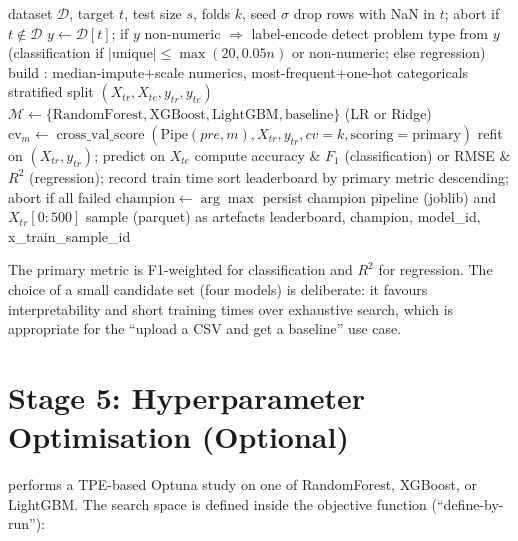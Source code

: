 \begin{algorithm}[H]
\caption{Parallel bake-off ().}
\label{alg:bakeoff}
\begin{algorithmic}[1]
\Require dataset $\mathcal{D}$, target $t$, test size $s$, folds $k$, seed $\sigma$
\State drop rows with NaN in $t$; abort if $t \notin \mathcal{D}$
\State $y \gets \mathcal{D}[t]$; if $y$ non-numeric $\Rightarrow$ label-encode
\State detect problem type from $y$ (classification if $|\text{unique}| \le \max(20, 0.05n)$ or non-numeric; else regression)
\State build : median-impute+scale numerics, most-frequent+one-hot categoricals
\State stratified split $(X_{tr}, X_{te}, y_{tr}, y_{te})$
\State $\mathcal{M} \gets \{\text{RandomForest}, \text{XGBoost}, \text{LightGBM}, \text{baseline}\}$ (LR or Ridge)
  \State $\text{cv}_m \gets \operatorname{cross\_val\_score}(\text{Pipe}(pre, m), X_{tr}, y_{tr}, cv=k, \text{scoring}=\text{primary})$
  \State refit on $(X_{tr}, y_{tr})$; predict on $X_{te}$
  \State compute accuracy \& $F_1$ (classification) or RMSE \& $R^2$ (regression); record train time
\EndFor
\State sort leaderboard by primary metric descending; abort if all failed
\State $\text{champion} \gets \arg\max$
\State persist champion pipeline (joblib) and $X_{tr}[0{:}500]$ sample (parquet) as artefacts
\State \Return leaderboard, champion, model\_id, x\_train\_sample\_id
\end{algorithmic}
\end{algorithm}

The primary metric is F1-weighted for classification and $R^2$ for
regression. The choice of a small candidate set (four models) is
deliberate: it favours interpretability and short training times
over exhaustive search, which is appropriate for the ``upload a CSV
and get a baseline'' use case.

\section{Stage 5: Hyperparameter Optimisation (Optional)}
\label{sec:stage-hpo}

 performs a
TPE-based Optuna study on one of RandomForest, XGBoost, or LightGBM.
The search space is defined inside the objective function
(``define-by-run''):

